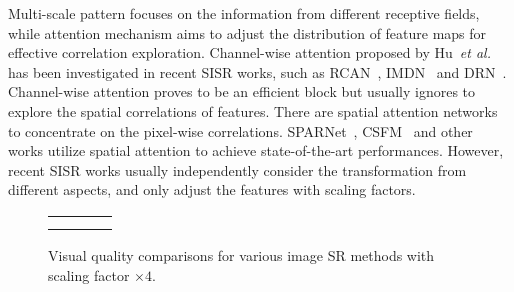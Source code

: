 \documentclass[manuscript,screen]{acmart}
\begin{document}
Multi-scale pattern focuses on the information from different receptive fields, while attention mechanism aims to adjust the distribution of feature maps for effective correlation exploration. Channel-wise attention proposed by Hu~\textit{et al.}~\cite{senet_pami2020} has been investigated in recent SISR works, such as RCAN~\cite{rcan_eccv2018}, IMDN~\cite{imdn_mm2019} and DRN~\cite{drn_cvpr2020}. Channel-wise attention proves to be an efficient block but usually ignores to explore the spatial correlations of features. There are spatial attention networks to concentrate on the pixel-wise correlations. SPARNet~\cite{sparnet_tip2020}, CSFM~\cite{csfm_csvt2020} and other works utilize spatial attention to achieve state-of-the-art performances. However, recent SISR works usually independently consider the transformation from different aspects, and only adjust the features with scaling factors.

\begin{figure}[t]
	\captionsetup[subfloat]{labelformat=empty, justification=centering}
	\begin{center}
		\newcommand{\rowArg}{2.2cm}
		\newcommand{\fullSize}{4.9cm}
		\newcommand{\fullWidth}{7cm}
		\newcommand{\patchSize}{2cm}
		\scriptsize
		\setlength\tabcolsep{0.05cm}
		\begin{tabular}[b]{c c c c c c}
			\multicolumn{3}{c}{\multirow{2}{*}[\rowArg]{
					\subfloat[image\_024 from Urban100~\cite{urban100}]
					{\includegraphics[height=\fullSize, width=\fullWidth]
						{Figs/img_024/full_HR.png}}}} &
			\subfloat[HR~\protect\linebreak(PSNR/SSIM)]
			{\includegraphics[width = \patchSize, height = \patchSize]
				{Figs/img_024/part_HR.png}} &
			\subfloat[Bicubic~\protect\linebreak(16.94/0.5539)]
			{\includegraphics[width = \patchSize, height = \patchSize]
				{Figs/img_024/part_bicubic.png}} &
			\subfloat[MSLapSRN~\cite{lapsrn_pami2019} \protect\linebreak(18.10/0.6714)]
			{\includegraphics[width = \patchSize, height = \patchSize]
				{Figs/img_024/part_LapSRN.png}} \\ [-0.3cm]
			& & & 
			\subfloat[CARN~\cite{carn_eccv2018} \protect\linebreak(18.84/0.7132)]
			{\includegraphics[width = \patchSize, height = \patchSize]
				{Figs/img_024/part_CARN.png}} &
			\subfloat[MSRN~\cite{msrn_eccv2018} \protect\linebreak(18.81/0.7224)]
			{\includegraphics[width = \patchSize, height = \patchSize]
				{Figs/img_024/part_MSRN.png}} &
			\subfloat[SHSR\protect\linebreak(\textbf{19.09}/\textbf{0.7340})]
			{\includegraphics[width = \patchSize, height = \patchSize]
				{Figs/img_024/part_PMRN.png}} \\
		\end{tabular}
	\end{center}
	\setlength{\abovecaptionskip}{0pt plus 2pt minus 2pt}
	\setlength{\belowcaptionskip}{0pt plus 2pt minus 2pt}
	\caption{Visual quality comparisons for various image SR methods with scaling factor $\times4$.}
	\label{fig:slogan}
\end{figure}
\end{document}
